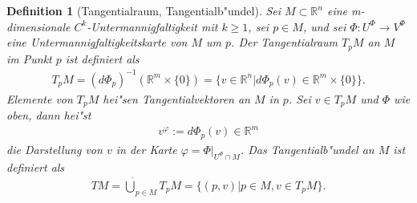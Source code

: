 \documentclass[10pt,a4paper]{article}
\newcommand{\fc}[1]{\special{fc=#1}}
\newtheorem{defi}[sat]{Definition}
\begin{document}
\fc{Dtaratb}
\begin{defi}[Tangentialraum, Tangentialb"undel]
 
Sei $M\subset \mathbb{R}^n$ eine m-dimensionale $C^k$-Untermannigfaltigkeit
mit $k\geq 1$, sei $p\in M$, und sei $\Phi:U^\Phi \rightarrow V^\Phi$ eine
Untermannigfaltigkeitskarte von $M$ um $p$. Der Tangentialraum $T_pM$ an $M$ im
Punkt $p$ ist definiert als
\begin{equation*}\begin{aligned}
 T_pM=\left( d\Phi_p \right)^{-1}\left( \mathbb{R}^m\times \{0\} \right)=
 \{v\in \mathbb{R}^n| d\Phi_p(v) \in \mathbb{R}^m\times \{0\}\}.
\end{aligned}\end{equation*}
Elemente von $T_pM$ hei"sen Tangentialvektoren an $M$ in $p$. Sei $v\in T_pM$
und $\Phi$ wie oben, dann hei"st
\begin{equation*}\begin{aligned}
 v^\varphi := d\Phi_{p}(v)\in \mathbb{R}^m
\end{aligned}\end{equation*}
die Darstellung von $v$ in der Karte $\varphi=\Phi|_{U^\Phi\cap M}$. Das
Tangentialb"undel an $M$ ist definiert als
\begin{equation*}\begin{aligned}
 TM=\dot\bigcup_{p\in M} T_pM= \{ (p,v)|p\in M, v\in T_pM \}.
\end{aligned}\end{equation*}


\end{defi}
\end{document}
